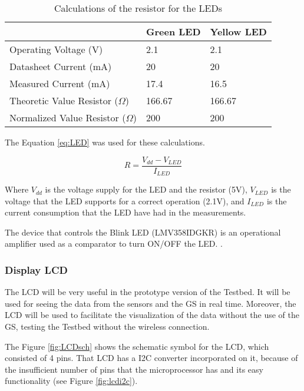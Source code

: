 \begin{table}[H]
\centering
\begin{tabular}{|l|l|l|}
\hline
						& \textbf{Green LED} & \textbf{Yellow LED} \\ \hline
Operating Voltage (V) & 2.1							& 2.1     \\ \hline
Datasheet Current (mA) & 20							& 20     \\ \hline
Measured Current (mA) & 17.4							& 16.5    \\ \hline
Theoretic Value Resistor ($\Omega$) & 166.67						& 166.67    \\ \hline
Normalized Value Resistor ($\Omega$) & 200						& 200   \\ \hline
\end{tabular}
\caption{Calculations of the resistor for the LEDs}\label{tab:LEDsvalue}
\end{table}

The Equation \ref{eq:LED} was used for these calculations.

\begin{equation}
R =  \frac{V_{dd}-V_{LED}}{I_{LED}}
\label{eq:LED}
\end{equation}

Where $ V_{dd}$ is the voltage supply for the LED and the resistor (5V), $ V_{LED}$ is the voltage that the LED supports for a correct operation (2.1V), and $I_{LED}$ is the current consumption that the LED have had in the measurements.

The device that controls the Blink LED (LMV358IDGKR) is an operational amplifier used as a comparator to turn ON/OFF the LED. \cite{LMV358IDGKR}.

\subsubsection{Display LCD} \label{sssec:LCDdesign}
The \acrshort{LCD} will be very useful in the prototype version of the Testbed. It will be used for seeing the data from the sensors and the \acrshort{GS} in real time. 
Moreover, the \acrshort{LCD} will be used to facilitate the visualization of the data without the use of the \acrshort{GS}, testing the Testbed without the wireless connection.  

The Figure \ref{fig:LCDsch} shows the schematic symbol for the \acrshort{LCD}, which consisted of 4 pins. That LCD has a I2C converter incorporated on it, because of the insufficient number of pins that the microprocessor has and its easy functionality (see Figure \ref{fig:lcdi2c}).

